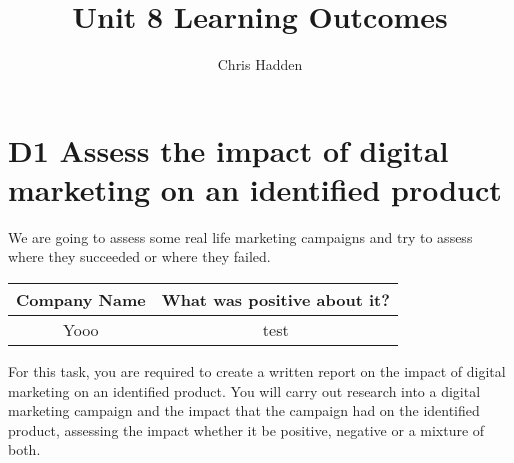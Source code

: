 \documentclass{article}
\begin{document}
\title{Unit 8 Learning Outcomes}
\author{Chris Hadden}
\date{}
\maketitle

\section{D1 Assess the impact of digital marketing on an identified product}

We are going to assess some real life marketing campaigns and try to assess where they succeeded or where they failed.


\begin{table}[h!]
    \centering
    \begin{tabular}{|c|c|}
       \hline
       \multicolumn{1}{c}{\bfseries Company Name} & \multicolumn{1}{c}{\bfseries What was positive about it?}  \\
             \hline
         Yooo & test \\
        \hline
    \end{tabular}

\end{table}

For this task, you are required to create a written report on the impact of digital marketing on an identified
product. You will carry out research into a digital marketing campaign and the impact that the campaign had
on the identified product, assessing the impact whether it be positive, negative or a mixture of both.
\end{document}
